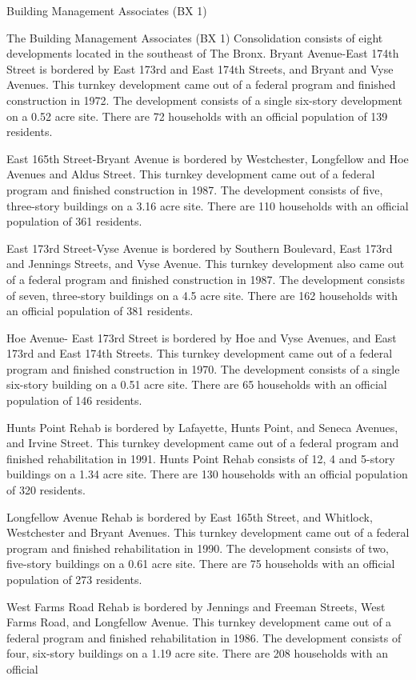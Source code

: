 Building Management Associates (BX 1)\par \vspace{.7\baselineskip}The Building Management Associates (BX 1) Consolidation consists of eight developments located in the southeast of The Bronx. Bryant Avenue-East 174th Street is bordered by East 173rd and East 174th Streets, and Bryant and Vyse Avenues. This turnkey development came out of a federal program and finished construction in 1972. The development consists of a single six-story development on a 0.52 acre site. There are 72 households with an official population of 139 residents.\par \vspace{.7\baselineskip}East 165th Street-Bryant Avenue is bordered by Westchester, Longfellow and Hoe Avenues and Aldus Street. This turnkey development came out of a federal program and finished construction in 1987. The development consists of five, three-story buildings on a 3.16 acre site. There are 110 households with an official population of 361 residents. \par \vspace{.7\baselineskip}East 173rd Street-Vyse Avenue is bordered by Southern Boulevard, East 173rd and Jennings Streets, and Vyse Avenue. This turnkey development also came out of a federal program and finished construction in 1987. The development consists of seven, three-story buildings on a 4.5 acre site. There are 162 households with an official population of 381 residents.\par \vspace{.7\baselineskip}Hoe Avenue- East 173rd Street is bordered by Hoe and Vyse Avenues, and East 173rd and East 174th Streets. This turnkey development came out of a federal program and finished construction in 1970. The development consists of a single six-story building on a 0.51 acre site. There are 65 households with an official population of 146 residents.\par \vspace{.7\baselineskip}Hunts Point Rehab is bordered by Lafayette, Hunts Point, and Seneca Avenues, and Irvine Street. This turnkey development came out of a federal program and finished rehabilitation in 1991. Hunts Point Rehab consists of 12, 4 and 5-story buildings on a 1.34 acre site. There are 130 households with an official population of 320 residents. \par \vspace{.7\baselineskip}Longfellow Avenue Rehab is bordered by East 165th Street, and Whitlock, Westchester and Bryant Avenues. This turnkey development came out of a federal program and finished rehabilitation in 1990. The development consists of two, five-story buildings on a 0.61 acre site. There are 75 households with an official population of 273 residents. \par \vspace{.7\baselineskip}West Farms Road Rehab is bordered by Jennings and Freeman Streets, West Farms Road, and Longfellow Avenue. This turnkey development came out of a federal program and finished rehabilitation in 1986. The development consists of four, six-story buildings on a 1.19 acre site. There are 208 households with an official 
